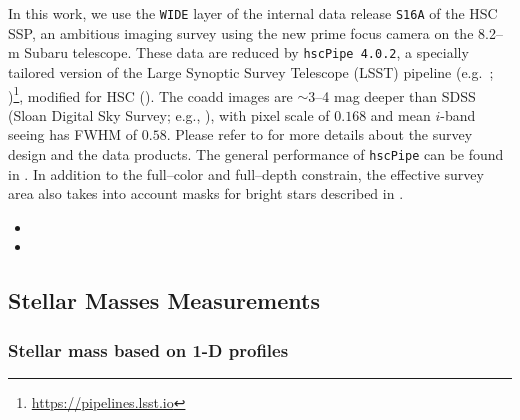 \documentclass[a4paper,fleqn,usenatbib]{mnras}
\begin{document}

	
	In this work, we use the \texttt{WIDE} layer of the internal data release 
	\texttt{S16A} of the HSC SSP, an ambitious imaging survey using the new prime focus 
	camera on the 8.2--m Subaru telescope. 
	These data are reduced by \texttt{hscPipe 4.0.2}, a specially tailored version of 
	the Large Synoptic Survey Telescope (LSST) pipeline (e.g.\ \citealt{Juric2015}; 
	\citealt{Axelrod2010})\footnote{\url{https://pipelines.lsst.io}}, 
	modified for HSC (\citealt{HSC-PIPE}).
	The coadd images are $\sim$3--4 mag deeper than SDSS (Sloan Digital Sky Survey; 
	e.g., \citealt{SDSS-DR7, SDSS-DR8, SDSS-DR12}), with pixel scale of 0\asec{}$.168$
	and mean $i$-band seeing has FWHM of 0\asec{}$.58$.
	Please refer to \citet{HSC-SSP, HSC-DR1} for more details about the survey design
	and the data products.
	The general performance of \texttt{hscPipe} can be found in \citet{SynPipe}.
	In addition to the full--color and full--depth constrain, the effective survey 
	area also takes into account masks for bright stars described in
	\citet{HSC-STAR}.
	
	\begin{itemize}
		
		\item {}
		
		\item {}
		
	\end{itemize}
    

\subsection{Stellar Masses Measurements}
    \label{sec:mstar}


\subsubsection{Stellar mass based on 1-D \mden{} profiles}
	\label{sec:m1d}
\end{document}
